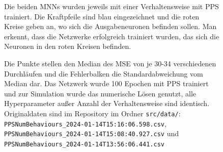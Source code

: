 \documentclass[10pt]{scrartcl}
\newcommand{\filepath}[1]{\texttt{#1}}
\begin{document}
\begin{figure}[H]
  \centering
  \hfill
  \caption{Die beiden MNNs wurden jeweils mit einer Verhaltensweise mit PPS trainiert. Die Kraftpfeile sind blau eingezeichnet und die roten Kreise geben an, wo sich die Ausgabeneuronen befinden sollen. Man erkennt, dass die Netzwerke erfolgreich trainiert wurden, das sich die Neuronen in den roten Kreisen befinden.}
  \label{fig:succes}
\end{figure}


\begin{figure}[H]
    \centering
    \Data
    \caption{Die Punkte stellen den Median des MSE von je 30-34 verschiedenen Durchläufen und die Fehlerbalken die Standardabweichung vom Median dar. Das Netzwerk wurde 100 Epochen mit PPS trainiert und zur Simulation wurde das numerische Lösen genutzt, alle Hyperparameter außer Anzahl der Verhaltensweise sind identisch. Originaldaten sind im Repository \cite{RepoMNN} im Ordner \filepath{src/data/}: \filepath{PPSNumBehaviours\_2024-01-14T15:16:06.598.csv}, \filepath{PPSNumBehaviours\_2024-01-14T15:08:40.927.csv} und \filepath{PPSNumBehaviours\_2024-01-14T13:56:06.441.csv}}
    \label{fig:numbehaviours}
\end{figure}
\end{document}
